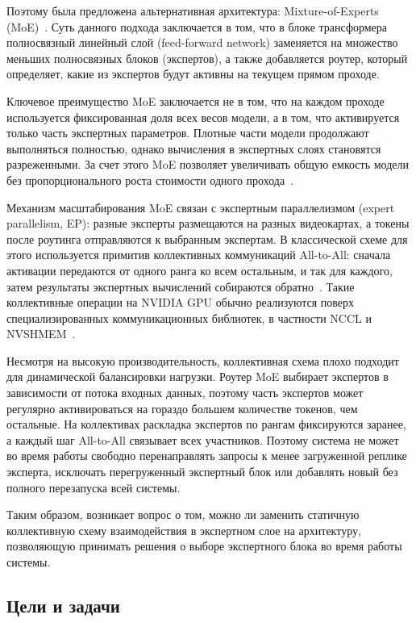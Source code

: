 Поэтому была предложена альтернативная архитектура: Mixture-of-Experts (MoE)~\cite{shazeer2017moe}. Суть данного подхода заключается в том, что в блоке трансформера полносвязный линейный слой (feed-forward network) заменяется на множество меньших полносвязных блоков (экспертов), а также добавляется роутер, который определяет, какие из экспертов будут активны на текущем прямом проходе.

Ключевое преимущество MoE заключается не в том, что на каждом проходе используется фиксированная доля всех весов модели, а в том, что активируется только часть экспертных параметров. Плотные части модели продолжают выполняться полностью, однако вычисления в экспертных слоях становятся разреженными. За счет этого MoE позволяет увеличивать общую емкость модели без пропорционального роста стоимости одного прохода~\cite{fedus2021switch,du2021glam}.

Механизм масштабирования MoE связан с экспертным параллелизмом (expert parallelism, EP): разные эксперты размещаются на разных видеокартах, а токены после роутинга отправляются к выбранным экспертам. В классической схеме для этого используется примитив коллективных коммуникаций All-to-All: сначала активации передаются от одного ранга ко всем остальным, и так для каждого, затем результаты экспертных вычислений собираются обратно~\cite{rajbhandari2022deepspeedmoe,deepseekDeepEP}. Такие коллективные операции на NVIDIA GPU обычно реализуются поверх специализированных коммуникационных библиотек, в частности NCCL и NVSHMEM~\cite{nvidiaNCCLDocs,nvidiaNvshmem}.

Несмотря на высокую производительность, коллективная схема плохо подходит для динамической балансировки нагрузки. Роутер MoE выбирает экспертов в зависимости от потока входных данных, поэтому часть экспертов может регулярно активироваться на гораздо большем количестве токенов, чем остальные. На коллективах раскладка экспертов по рангам фиксируются заранее, а каждый шаг All-to-All связывает всех участников. Поэтому система не может во время работы свободно перенаправлять запросы к менее загруженной реплике эксперта, исключать перегруженный экспертный блок или добавлять новый без полного перезапуска всей системы.

Таким образом, возникает вопрос о том, можно ли заменить статичную коллективную схему взаимодействия в экспертном слое на архитектуру, позволяющую принимать решения о выборе экспертного блока во время работы системы.

\subsection*{Цели и задачи}

